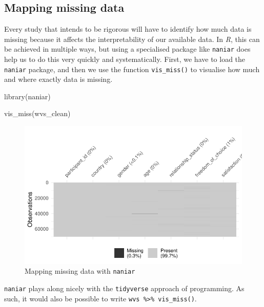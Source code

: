 \documentclass[
  letterpaper,
]{krantz}
\makeatletter
\newenvironment{Shaded}{\begin{snugshade}}{\end{snugshade}}
\newcommand{\FunctionTok}[1]{\textcolor[rgb]{0.28,0.35,0.67}{#1}}
\newcommand{\NormalTok}[1]{\textcolor[rgb]{0.00,0.23,0.31}{#1}}
\newenvironment{kframe}{%
\medskip{}
\setlength{\fboxsep}{.8em}
 \def\at@end@of@kframe{}%
 \ifinner\ifhmode%
  \def\at@end@of@kframe{\end{minipage}}%
  \begin{minipage}{\columnwidth}%
 \fi\fi%
 \def\FrameCommand##1{\hskip\@totalleftmargin \hskip-\fboxsep
 \colorbox{shadecolor}{##1}\hskip-\fboxsep
     \hskip-\linewidth \hskip-\@totalleftmargin \hskip\columnwidth}%
 \MakeFramed {\advance\hsize-\width
   \@totalleftmargin\z@ \linewidth\hsize
   \@setminipage}}%
 {\par\unskip\endMakeFramed%
 \at@end@of@kframe}
\renewenvironment{Shaded}{\begin{kframe}}{\end{kframe}}
\makeatother
\begin{document}
\subsection{Mapping missing data}\label{mapping-missing-data}

Every study that intends to be rigorous will have to identify how much
data is missing because it affects the interpretability of our available
data. In \emph{R}, this can be achieved in multiple ways, but using a
specialised package like \texttt{naniar} does help us to do this very
quickly and systematically. First, we have to load the \texttt{naniar}
package, and then we use the function \texttt{vis\_miss()} to visualise
how much and where exactly data is missing.

\begin{Shaded}
\begin{Highlighting}[]
\FunctionTok{library}\NormalTok{(naniar)}

\FunctionTok{vis\_miss}\NormalTok{(wvs\_clean)}
\end{Highlighting}
\end{Shaded}

\begin{figure}[H]

{\centering \includegraphics{07_data_wrangling_files/figure-pdf/mapping-missing-data-1.pdf}

}

\caption{Mapping missing data with \texttt{naniar}}

\end{figure}%

\texttt{naniar} plays along nicely with the \texttt{tidyverse} approach
of programming. As such, it would also be possible to write
\texttt{wvs\ \%\textgreater{}\%\ vis\_miss()}.
\end{document}
